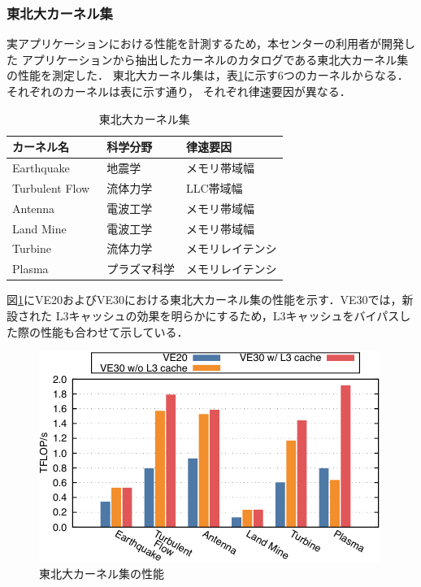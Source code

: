 ﻿\documentclass[submit,techrep,noauthor]{ipsj}
\begin{document}
\subsubsection{東北大カーネル集}

実アプリケーションにおける性能を計測するため，本センターの利用者が開発した
アプリケーションから抽出したカーネルのカタログである東北大カーネル集の性能を測定した．
東北大カーネル集は，表\ref{tbl:isc-kernels}に示す6つのカーネルからなる．それぞれのカーネルは表に示す通り，
それぞれ律速要因が異なる．

\begin{table}
\caption{東北大カーネル集}\label{tbl:isc-kernels}
\begin{tabular}{@{}lll@{}}
\toprule
カーネル名                          & 科学分野        & 律速要因            \\ \midrule
Earthquake~\cite{Ariyoshi2007}      & 地震学          & メモリ帯域幅        \\
Turbulent Flow~\cite{Tsukahara2007} & 流体力学        & LLC帯域幅           \\
Antenna~\cite{Sato2011}             & 電波工学        & メモリ帯域幅        \\
Land Mine~\cite{Sato2003}           & 電波工学        & メモリ帯域幅        \\
Turbine~\cite{Tsukahara2007}        & 流体力学        & メモリレイテンシ    \\
Plasma~\cite{Katoh2005}             & プラズマ科学    & メモリレイテンシ    \\ \bottomrule
\end{tabular}
\end{table}

図\ref{fig:isc-kernels}にVE20およびVE30における東北大カーネル集の性能を示す．VE30では，新設された
L3キャッシュの効果を明らかにするため，L3キャッシュをバイパスした際の性能も合わせて示している．

\begin{figure}
  \centering
  \includegraphics{figs/isc_kernels.pdf}
  \caption{東北大カーネル集の性能}\label{fig:isc-kernels}
\end{figure}
\end{document}
